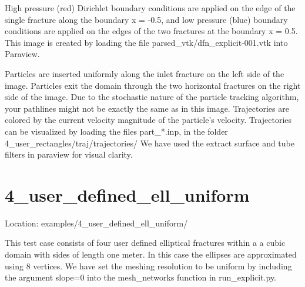 \documentclass[letterpaper,10pt,english]{sphinxmanual}
\begin{document}
\begin{figure}[htbp]
\centering
\capstart

\noindent{}
\caption{}\label{\detokenize{examples:id1}}\end{figure}

High pressure (red) Dirichlet boundary conditions are applied on the edge of the single fracture along the boundary x = -0.5, and low pressure (blue) boundary conditions are applied on the edges of the two fractures at the boundary x = 0.5.
This image is created by loading the file parsed\_vtk/dfn\_explicit-001.vtk into Paraview.

\begin{figure}[htbp]
\centering
\capstart

\noindent{}
\caption{}\label{\detokenize{examples:id2}}\end{figure}

Particles are inserted uniformly along the inlet fracture on the left side of the image.
Particles exit the domain through the two horizontal fractures on the right side of the image.
Due to the stochastic nature of the particle tracking algorithm, your pathlines might not be exactly the same as in this image.
Trajectories are colored by the current velocity magnitude of the particle’s velocity.
Trajectories can be visualized by loading the files part\_*.inp, in the folder 4\_user\_rectangles/traj/trajectories/
We have used the extract surface and tube filters in paraview for visual clarity.

\begin{figure}[htbp]
\centering
\capstart

\noindent{}
\caption{}\label{\detokenize{examples:id3}}\end{figure}


\section{4\_user\_defined\_ell\_uniform}
\label{\detokenize{examples:user-defined-ell-uniform}}
Location: examples/4\_user\_defined\_ell\_uniform/

This test case consists of four user defined elliptical fractures within a a cubic domain with sides of length one meter. In this case the ellipses are approximated using 8 vertices. We have set the meshing resolution to be uniform by including the argument slope=0 into the mesh\_networks function in run\_explicit.py.
\end{document}
